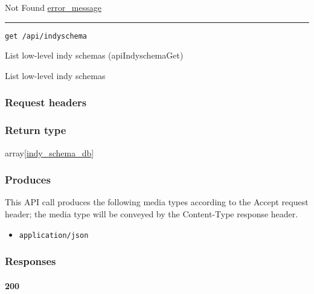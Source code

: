 Not Found \protect\hyperlink{error_message}{error\_message}

\begin{center}\rule{0.5\linewidth}{\linethickness}\end{center}

\protect\hypertarget{apiIndyschemaGet}{}{}

\begin{verbatim}
get /api/indyschema
\end{verbatim}

List low-level indy schemas ({apiIndyschemaGet})

List low-level indy schemas

\hypertarget{request-headers-41}{%
\subsubsection{Request headers}\label{request-headers-41}}

\hypertarget{return-type-58}{%
\subsubsection{Return type}\label{return-type-58}}

array{[}\protect\hyperlink{indy_schema_db}{indy\_schema\_db}{]}

\hypertarget{produces-72}{%
\subsubsection{Produces}\label{produces-72}}

This API call produces the following media types according to the
{Accept} request header; the media type will be conveyed by the
{Content-Type} response header.

\begin{itemize}
\tightlist
\item
  \texttt{application/json}
\end{itemize}

\hypertarget{responses-72}{%
\subsubsection{Responses}\label{responses-72}}

\hypertarget{section-239}{%
\paragraph{200}\label{section-239}}


